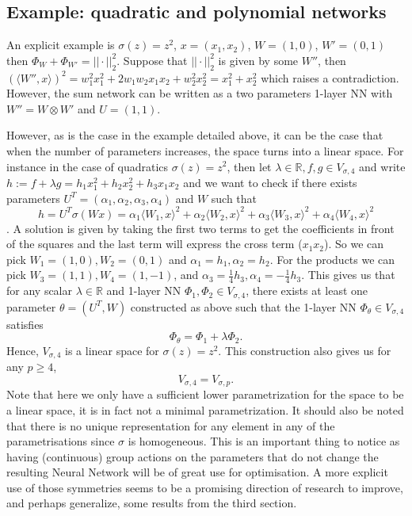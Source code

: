 \documentclass[11pt]{article} %
\begin{document}
\subsection{Example: quadratic and polynomial networks}
An explicit example is 
$\sigma(z) = z^2$, 
$x = (x_1, x_2)$, 
$W = (1, 0)$, $W' = (0,1)$ then $\Phi_W + \Phi_{W'} = ||\cdot||_2^2$. Suppose that $||\cdot||_2^2$ is given by some $W''$, then
$ (\langle {W''}, x\rangle)^2 = w_{1}^2x_1^2 + 2w_{1}w_{2}x_1x_2 + w_{2}^2x_2^2 = x_1^2 + x_2^2 $ which raises a contradiction. However, the sum network can be written as a two parameters 1-layer NN with $W'' = W\otimes W'$ and $U=(1, 1)$. 
\par
However, as is the case in the example detailed above, it can be the case that when the number of parameters increases, the space turns into a linear space. For instance in the case of quadratics $\sigma(z) = z^2$, then let $\lambda \in \mathbb{R}, f,g \in V_{\sigma, 4}$ and write $h := f + \lambda g = h_1x_1^2 + h_2x_2^2+h_3x_1x_2$ and we want to check if there exists parameters $U^T = (\alpha_1, \alpha_2, \alpha_3, \alpha_4)$ and $W$ such that $$h= U^T \sigma(Wx) = \alpha_1 \langle W_1, x\rangle^2 + \alpha_2\langle W_2, x\rangle^2 + \alpha_3 \langle W_3, x\rangle^2 + \alpha_4\langle W_4, x\rangle^2$$.
A solution is given by taking the first two terms to get the coefficients in front of the squares and the last term will express the cross term ($x_1x_2$). So we can pick $W_1 = (1,0), W_2=(0,1)$ and $\alpha_1 = h_1, \alpha_2 = h_2$. For the products we can pick $W_3 = (1, 1), W_4=(1,-1)$, and $\alpha_3 = \frac{1}{4}h_3, \alpha_4 = -\frac{1}{4}h_3$.
\newline
This gives us that for any scalar $\lambda \in \mathbb{R}$ and 1-layer NN $\Phi_1, \Phi_2\in V_{\sigma, 4}$, there exists at least one parameter $\theta = (U^T,W)$ constructed as above such that the 1-layer NN $\Phi_\theta \in V_{\sigma, 4}$ satisfies
$$\Phi_\theta = \Phi_1 + \lambda\Phi_2.$$
Hence, $V_{\sigma,4}$ is a linear space for $\sigma(z) = z^2$. This construction also gives us for any $p\geq 4$,
$$V_{\sigma, 4} = V_{\sigma,p}.$$
Note that here we only have a sufficient lower parametrization for the space to be a linear space, it is in fact not a minimal parametrization. It should also be noted that there is no unique representation for any element in any of the parametrisations since $\sigma$ is homogeneous. This is an important thing to notice as having (continuous) group actions on the parameters that do not change the resulting Neural Network will be of great use for optimisation. A more explicit use of those symmetries seems to be a promising direction of research to improve, and perhaps generalize, some results from the third section.
\end{document}
